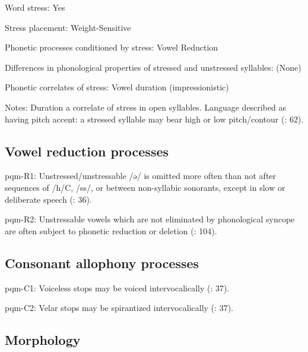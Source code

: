 {\begin{appendixdesc}
\item[Word stress:] Yes

\item[Stress placement:] Weight-Sensitive

\item[Phonetic processes conditioned by stress:] Vowel Reduction

\item[Differences in phonological properties of stressed and unstressed syllables:] (None)

\item[Phonetic correlates of stress:] Vowel duration (impressionistic)

\item[Notes:] Duration a correlate of stress in open syllables. Language described as having pitch accent: a stressed syllable may bear high or low pitch/contour (\citealt{LeSourd1993}: 62).
\end{appendixdesc}
\subsection*{Vowel reduction processes}
\begin{appendixdesc}

\item[pqm-R1:] Unstressed/unstressable /ə/ is omitted more often than not after sequences of /h/C, /ss/, or between non-syllabic sonorants, except in slow or deliberate speech (\citealt{LeSourd1993}: 36).

\item[pqm-R2:] Unstressable vowels which are not eliminated by phonological syncope are often subject to phonetic reduction or deletion (\citealt{LeSourd1993}: 104).
\end{appendixdesc}
\subsection*{Consonant allophony processes}
\begin{appendixdesc}

\item[pqm-C1:] Voiceless stops may be voiced intervocalically (\citealt{LeSourd1993}: 37).

\item[pqm-C2:] Velar stops may be spirantized intervocalically (\citealt{LeSourd1993}: 37).
\end{appendixdesc}
\subsection*{Morphology}

}
